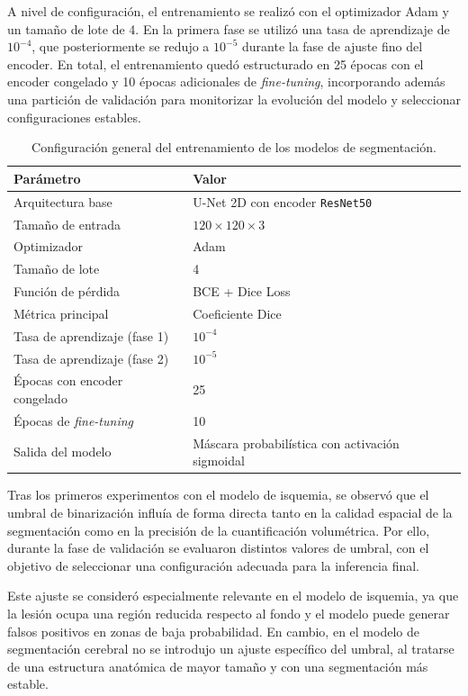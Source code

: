 A nivel de configuración, el entrenamiento se realizó con el optimizador Adam y un tamaño de lote de 4. En la primera fase se utilizó una tasa de aprendizaje de \(10^{-4}\), que posteriormente se redujo a \(10^{-5}\) durante la fase de ajuste fino del encoder. En total, el entrenamiento quedó estructurado en 25 épocas con el encoder congelado y 10 épocas adicionales de \textit{fine-tuning}, incorporando además una partición de validación para monitorizar la evolución del modelo y seleccionar configuraciones estables.

\begin{table}[h]
\centering
\caption{Configuración general del entrenamiento de los modelos de segmentación.}
\label{tab:config_entrenamiento}
\begin{tabular}{ll}
\hline
Parámetro & Valor \\
\hline
Arquitectura base & U-Net 2D con encoder \texttt{ResNet50} \\
Tamaño de entrada & \(120 \times 120 \times 3\) \\
Optimizador & Adam \\
Tamaño de lote & 4 \\
Función de pérdida & BCE + Dice Loss \\
Métrica principal & Coeficiente Dice \\
Tasa de aprendizaje (fase 1) & \(10^{-4}\) \\
Tasa de aprendizaje (fase 2) & \(10^{-5}\) \\
Épocas con encoder congelado & 25 \\
Épocas de \textit{fine-tuning} & 10 \\
Salida del modelo & Máscara probabilística con activación sigmoidal \\
\hline
\end{tabular}
\end{table}

Tras los primeros experimentos con el modelo de isquemia, se observó que el umbral de binarización influía de forma directa tanto en la calidad espacial de la segmentación como en la precisión de la cuantificación volumétrica. Por ello, durante la fase de validación se evaluaron distintos valores de umbral, con el objetivo de seleccionar una configuración adecuada para la inferencia final.

Este ajuste se consideró especialmente relevante en el modelo de isquemia, ya que la lesión ocupa una región reducida respecto al fondo y el modelo puede generar falsos positivos en zonas de baja probabilidad. En cambio, en el modelo de segmentación cerebral no se introdujo un ajuste específico del umbral, al tratarse de una estructura anatómica de mayor tamaño y con una segmentación más estable.

